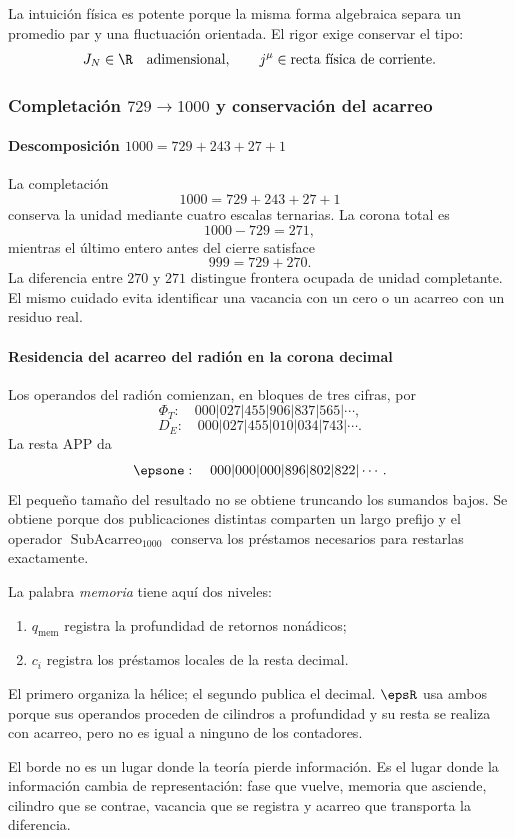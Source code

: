La intuición física es potente porque la misma forma algebraica separa un
promedio par y una fluctuación orientada. El rigor exige conservar el tipo:
\[
J_N\in\R\quad\text{adimensional},
\qquad
j^\mu\in\text{recta física de corriente}.
\]

\subsubsection{Completación \(729\to1000\) y conservación del acarreo}

\paragraph{Descomposición \(1000=729+243+27+1\)}

La completación
\[
1000=729+243+27+1
\]
conserva la unidad mediante cuatro escalas ternarias. La corona total es
\[
1000-729=271,
\]
mientras el último entero antes del cierre satisface
\[
999=729+270.
\]
La diferencia entre \(270\) y \(271\) distingue frontera ocupada de unidad
completante. El mismo cuidado evita identificar una vacancia con un cero o un
acarreo con un residuo real.

\paragraph{Residencia del acarreo del radión en la corona decimal}

Los operandos del radión comienzan, en bloques de tres cifras, por
\[
\Phi_T:\quad000|027|455|906|837|565|\cdots,
\]
\[
D_E:\quad000|027|455|010|034|743|\cdots.
\]
La resta APP da
\[
\epsone:\quad000|000|000|896|802|822|\cdots.
\]
El pequeño tamaño del resultado no se obtiene truncando los sumandos bajos.
Se obtiene porque dos publicaciones distintas comparten un largo prefijo y el
operador \(\operatorname{SubAcarreo}_{1000}\) conserva los préstamos necesarios
para restarlas exactamente.

La palabra \emph{memoria} tiene aquí dos niveles:
\begin{enumerate}
\item \(q_{\mathrm{mem}}\) registra la profundidad de retornos nonádicos;
\item \(c_i\) registra los préstamos locales de la resta decimal.
\end{enumerate}
El primero organiza la hélice; el segundo publica el decimal. \(\epsR\) usa
ambos porque sus operandos proceden de cilindros a profundidad y su resta se
realiza con acarreo, pero no es igual a ninguno de los contadores.

\begin{thesisbox}
El borde no es un lugar donde la teoría pierde información. Es el lugar donde
la información cambia de representación: fase que vuelve, memoria que
asciende, cilindro que se contrae, vacancia que se registra y acarreo que
transporta la diferencia.
\end{thesisbox}
